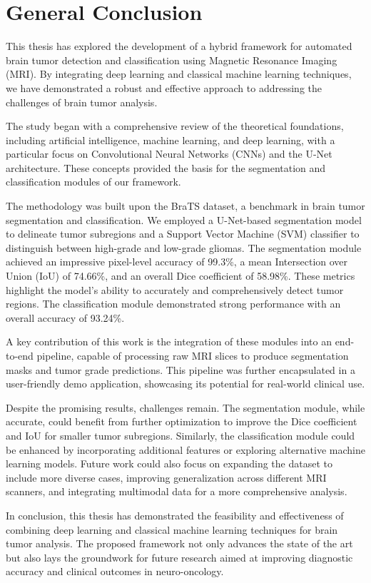 \chapter*{General Conclusion}

This thesis has explored the development of a hybrid framework for automated brain tumor detection and classification using Magnetic Resonance Imaging (MRI). By integrating deep learning and classical machine learning techniques, we have demonstrated a robust and effective approach to addressing the challenges of brain tumor analysis.

The study began with a comprehensive review of the theoretical foundations, including artificial intelligence, machine learning, and deep learning, with a particular focus on Convolutional Neural Networks (CNNs) and the U-Net architecture. These concepts provided the basis for the segmentation and classification modules of our framework.

The methodology was built upon the BraTS dataset, a benchmark in brain tumor segmentation and classification. We employed a U-Net-based segmentation model to delineate tumor subregions and a Support Vector Machine (SVM) classifier to distinguish between high-grade and low-grade gliomas. The segmentation module achieved an impressive pixel-level accuracy of 99.3\%, a mean Intersection over Union (IoU) of 74.66\%, and an overall Dice coefficient of 58.98\%. These metrics highlight the model's ability to accurately and comprehensively detect tumor regions. The classification module demonstrated strong performance with an overall accuracy of 93.24\%.

A key contribution of this work is the integration of these modules into an end-to-end pipeline, capable of processing raw MRI slices to produce segmentation masks and tumor grade predictions. This pipeline was further encapsulated in a user-friendly demo application, showcasing its potential for real-world clinical use.

Despite the promising results, challenges remain. The segmentation module, while accurate, could benefit from further optimization to improve the Dice coefficient and IoU for smaller tumor subregions. Similarly, the classification module could be enhanced by incorporating additional features or exploring alternative machine learning models. Future work could also focus on expanding the dataset to include more diverse cases, improving generalization across different MRI scanners, and integrating multimodal data for a more comprehensive analysis.

In conclusion, this thesis has demonstrated the feasibility and effectiveness of combining deep learning and classical machine learning techniques for brain tumor analysis. The proposed framework not only advances the state of the art but also lays the groundwork for future research aimed at improving diagnostic accuracy and clinical outcomes in neuro-oncology.
